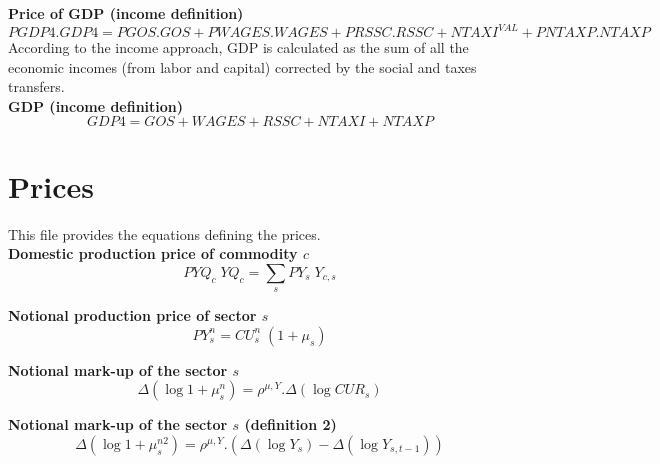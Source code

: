 \documentclass[12pt]{article}
\numberwithin{equation}{section}
\begin{document}
\noindent\textbf{Price of GDP (income definition)} \\
\begin{dmath}
PGDP4 . GDP4 = PGOS . GOS + PWAGES . WAGES + PRSSC . RSSC + NTAXI^{VAL} + PNTAXP . NTAXP
\end{dmath}
According to the income approach, GDP is calculated as the sum of all the economic incomes (from labor and capital) corrected by the social and taxes transfers. \\

\noindent\textbf{  GDP (income definition)} \\
\begin{dmath}
GDP4 = GOS + WAGES + RSSC + NTAXI + NTAXP
\end{dmath}



\section{Prices}



This file provides the equations defining the prices. \\

\noindent\textbf{Domestic production price of commodity $c$} \\
\begin{dmath}
PYQ_{c} \; YQ_{c} = \sum_{s} PY_{s} \; Y_{c, s}
\end{dmath}

\noindent\textbf{Notional production price of sector $s$} \\
\begin{dmath}
PY^{n}_{s} = CU^{n}_{s} \; \left( 1 + \mu_{s} \right)
\end{dmath}

\noindent\textbf{Notional mark-up of the sector $s$} \\
\begin{dmath}
\varDelta \left(\operatorname{log} 1 + \mu^{n}_{s}\right) = \rho^{\mu,Y} . \varDelta \left(\operatorname{log} CUR_{s}\right)
\end{dmath}

\noindent\textbf{Notional mark-up of the sector $s$ (definition 2)} \\
\begin{dmath}
\varDelta \left(\operatorname{log} 1 + \mu^{n2}_{s}\right) = \rho^{\mu,Y} . \left( \varDelta \left(\operatorname{log} Y_{s}\right) - \varDelta \left(\operatorname{log} Y_{s, t-1}\right) \right)
\end{dmath}
\end{document}

